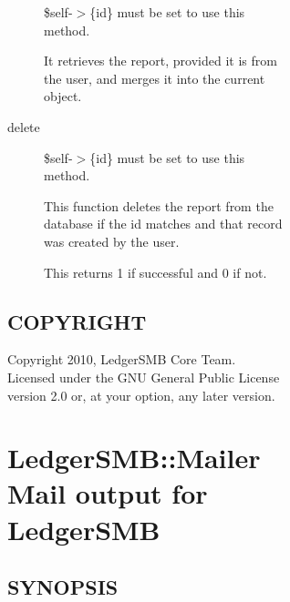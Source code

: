 \begin{description}
\begin{description}
\begin{description}
\begin{description}
\begin{description}
\begin{description}
\$self-$>$\{id\} must be set to use this method.



It retrieves the report, provided it is from the user, and merges it into the 
current object.


\item[{delete}] \mbox{}

\$self-$>$\{id\} must be set to use this method.



This function deletes the report from the database if the id matches and
that record was created by the user.



This returns 1 if successful and 0 if not.

\end{description}
\subsection*{COPYRIGHT\label{LedgerSMB::DBObject::Saved_Report:_Saved_Report_Handling_for_LSMB_COPYRIGHT}}


Copyright 2010, LedgerSMB Core Team.  Licensed under the GNU General Public 
License version 2.0 or, at your option, any later version.

\section{LedgerSMB::Mailer   Mail output for LedgerSMB\label{LedgerSMB::Mailer_Mail_output_for_LedgerSMB}}




\subsection*{SYNOPSIS\label{LedgerSMB::Mailer_Mail_output_for_LedgerSMB_SYNOPSIS}}

\end{description}
\end{description}
\end{description}
\end{description}
\end{description}
